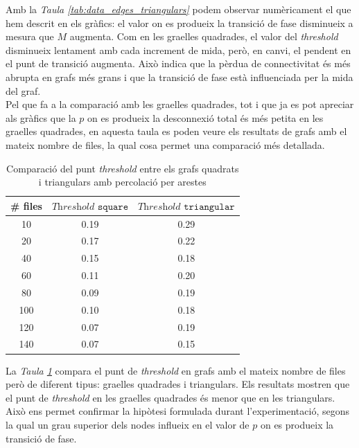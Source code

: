\documentclass[a4paper]{article}
\begin{document}
	Amb la \textit{Taula \ref{tab:data_edges_triangulars}} podem observar numèricament el que hem descrit en els gràfics: el valor on es produeix la transició de fase disminueix a mesura que $M$ augmenta. Com en les graelles quadrades, el valor del \textit{threshold} disminueix lentament amb cada increment de mida, però, en canvi, el pendent en el punt de transició augmenta. Això indica que la pèrdua de connectivitat és més abrupta en grafs més grans i que la transició de fase està influenciada per la mida del graf. \\
	
	Pel que fa a la comparació amb les graelles quadrades, tot i que ja es pot apreciar als gràfics que la $p$ on es produeix la desconnexió total és més petita en les graelles quadrades, en aquesta taula es poden veure els resultats de grafs amb el mateix nombre de files, la qual cosa permet una comparació més detallada.	
	
	\begin{table}[H]
		\centering
		\begin{tabular}{|c|c|c|}
			\hline
			\rowcolor{gray!30}
			\# files & $\textit{Threshold}\texttt{ square}$ &$\textit{Threshold}\texttt{ triangular}$ \\ \hline
			10 & 0.19 & 0.29 \\ \hline
			20 & 0.17 & 0.22 \\ \hline
			40 & 0.15 & 0.18 \\ \hline
			60 & 0.11 & 0.20 \\ \hline
			80 & 0.09 & 0.19 \\ \hline
			100 & 0.10 & 0.18\\ \hline
			120 & 0.07 & 0.19 \\ \hline
			140 & 0.07 & 0.15 \\ \hline
		\end{tabular}
		\caption{Comparació del punt \textit{threshold} entre els grafs quadrats i triangulars amb percolació per arestes}
		\label{tab:comparacio_threshold_square_triangular_edges}
	\end{table}
	
	La \textit{Taula \ref{tab:comparacio_threshold_square_triangular_edges}} compara el punt de \textit{threshold} en grafs amb el mateix nombre de files però de diferent tipus: graelles quadrades i triangulars. Els resultats mostren que el punt de \textit{threshold} en les graelles quadrades és menor que en les triangulars. Això ens permet confirmar la hipòtesi formulada durant l'experimentació, segons la qual un grau superior dels nodes influeix en el valor de $p$ on es produeix la transició de fase.
	
\end{document}
